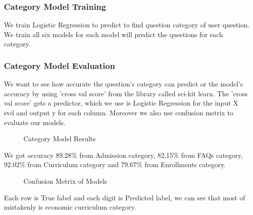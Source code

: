 \documentclass[12pt,oneside,openright,a4paper]{cpe-english-project}
\begin{document}
\subsubsection{Category Model Training}
We train Logistic Regression to predict to find question category of user question. We train all six models for each model will predict the questions for each category.
\subsubsection{Category Model Evaluation}
We want to see how accurate the question's category can predict or the model's accuracy by using 'cross val score' from the library called sci-kit learn.
The 'cross val score' gets a predictor, which we use is Logistic Regression for the input X svd and output y for each column. Moreover we also use confusion metrix to evaluate our models.

\begin{figure}[!h]\centering
{}
\caption{Category Model Results}\label{fig:Category Model Results}
\end{figure}
We got accuracy 89.28\% from Admission category, 82.15\% from FAQs category, 92.02\% from Curriculum category and 79.67\% from Enrollments category.
\pagebreak
\begin{figure}[!h]\centering
{}
\caption{Confusion Metrix of Models}\label{fig:Confusion Metrix of Models}
\end{figure}
Each row is True label and each digit is Predicted label, we can see that most of mistakenly is economic curriculum category. 
\end{document}

